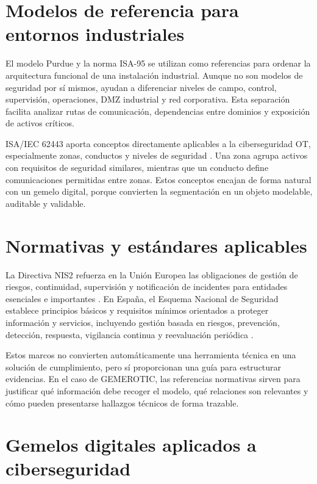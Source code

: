 \section{Modelos de referencia para entornos industriales} \label{sec:modelos-referencia}

El modelo Purdue y la norma ISA-95 se utilizan como referencias para ordenar la arquitectura funcional de una instalación industrial. Aunque no son modelos de seguridad por sí mismos, ayudan a diferenciar niveles de campo, control, supervisión, operaciones, DMZ industrial y red corporativa. Esta separación facilita analizar rutas de comunicación, dependencias entre dominios y exposición de activos críticos.

ISA/IEC 62443 aporta conceptos directamente aplicables a la ciberseguridad OT, especialmente zonas, conductos y niveles de seguridad \cite{isa62443}. Una zona agrupa activos con requisitos de seguridad similares, mientras que un conducto define comunicaciones permitidas entre zonas. Estos conceptos encajan de forma natural con un gemelo digital, porque convierten la segmentación en un objeto modelable, auditable y validable.

\section{Normativas y estándares aplicables} \label{sec:normativas}

La Directiva NIS2 refuerza en la Unión Europea las obligaciones de gestión de riesgos, continuidad, supervisión y notificación de incidentes para entidades esenciales e importantes \cite{nis2}. En España, el Esquema Nacional de Seguridad establece principios básicos y requisitos mínimos orientados a proteger información y servicios, incluyendo gestión basada en riesgos, prevención, detección, respuesta, vigilancia continua y reevaluación periódica \cite{ens}.

Estos marcos no convierten automáticamente una herramienta técnica en una solución de cumplimiento, pero sí proporcionan una guía para estructurar evidencias. En el caso de GEMEROTIC, las referencias normativas sirven para justificar qué información debe recoger el modelo, qué relaciones son relevantes y cómo pueden presentarse hallazgos técnicos de forma trazable.

\section{Gemelos digitales aplicados a ciberseguridad} \label{sec:gemelos-digitales}

